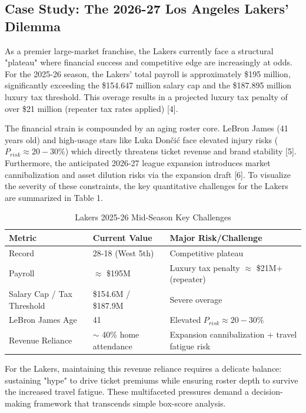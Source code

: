 \documentclass[12pt]{article}
\begin{document}
\subsection{Case Study: The 2026-27 Los Angeles Lakers' Dilemma}
As a premier large-market franchise, the Lakers currently face a structural "plateau" where financial success and competitive edge are increasingly at odds. For the 2025-26 season, the Lakers' total payroll is approximately \$195 million, significantly exceeding the \$154.647 million salary cap and the \$187.895 million luxury tax threshold. This overage results in a projected luxury tax penalty of over \$21 million (repeater tax rates applied) [4].

The financial strain is compounded by an aging roster core. LeBron James (41 years old) and high-usage stars like Luka Dončić face elevated injury risks ($P_{risk} \approx 20-30\%$) which directly threatens ticket revenue and brand stability [5]. Furthermore, the anticipated 2026-27 league expansion introduces market cannibalization and asset dilution risks via the expansion draft [6]. To visualize the severity of these constraints, the key quantitative challenges for the Lakers are summarized in Table 1.

\begin{table}[H]
\centering
\caption{Lakers 2025-26 Mid-Season Key Challenges}
\begin{tabular}{lll}
\toprule
\textbf{Metric} & \textbf{Current Value} & \textbf{Major Risk/Challenge} \\
\midrule
Record & 28-18 (West 5th) & Competitive plateau \\
Payroll & $\approx$ \$195M & Luxury tax penalty $\approx$ \$21M+ (repeater) \\
Salary Cap / Tax Threshold & \$154.6M / \$187.9M & Severe overage \\
LeBron James Age & 41 & Elevated $P_{risk} \approx 20-30\%$ \\
Revenue Reliance & $\sim$ 40\% home attendance & Expansion cannibalization + travel fatigue risk \\
\bottomrule
\end{tabular}
\end{table}

For the Lakers, maintaining this revenue reliance requires a delicate balance: sustaining "hype" to drive ticket premiums while ensuring roster depth to survive the increased travel fatigue. These multifaceted pressures demand a decision-making framework that transcends simple box-score analysis.
\end{document}
